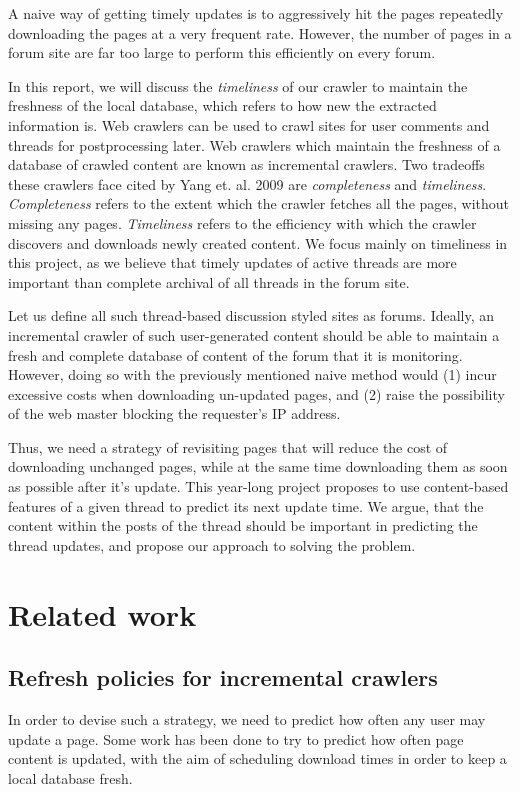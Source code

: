 \documentclass[12 pt]{article}
\begin{document}
A naive way of getting timely updates is to aggressively hit the pages repeatedly downloading the pages at a very
frequent rate. However, the number of pages in a forum site are far too large to perform this efficiently on every
forum.

In this report, we will discuss the \emph{timeliness} of our crawler to maintain the freshness of the local database, which refers to how new the extracted information is. Web crawlers can be used to crawl sites for user comments and threads for postprocessing later. Web crawlers which maintain the freshness of a database of crawled content are known as incremental crawlers. Two tradeoffs these crawlers face cited by Yang et. al. 2009 \cite{Yang2009} are \emph{completeness} and \emph{timeliness}. \emph{Completeness} refers to the extent which the crawler fetches all the pages, without missing any pages. \emph{Timeliness} refers to the efficiency with which the crawler discovers and downloads newly created content. We focus mainly on timeliness in this project, as we believe that timely updates of active threads are more important than complete archival of all threads in the forum site.

Let us define all such thread-based discussion styled sites as forums. Ideally, an incremental crawler of such user-generated content should be able to maintain a fresh and complete database of content of the forum that it is monitoring. However, doing so with the previously mentioned naive method would (1) incur excessive costs when downloading un-updated pages, and (2) raise the possibility of the web master blocking the requester's IP address.

Thus, we need a strategy of revisiting pages that will reduce the cost of downloading unchanged pages, while at the same time downloading them as soon as possible after it's update. This year-long project proposes to use content-based features of a given thread to predict its next update time. We argue, that the content within the posts of the thread should be important in predicting the thread updates, and propose our approach to solving the problem.

\section{Related work}

\subsection{Refresh policies for incremental crawlers}
In order to devise such a strategy, we need to predict how often any user may update a page. Some work has been done to try to predict how often page content is updated, with the aim of scheduling download times in order to keep a local database fresh.
\end{document}
